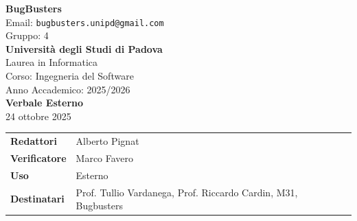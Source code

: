 \documentclass[a4paper,12pt]{article}
\begin{document}
\begin{center}  
  
  {\Large\bfseries\color{primaryblue} BugBusters}\\[0.3cm]
  {\small\color{darkgray} Email: \texttt{bugbusters.unipd@gmail.com}} \\[0.1cm]
  {\small\color{darkgray} Gruppo: 4} \\[0.5cm]

  {\large\bfseries Università degli Studi di Padova}\\[0.3cm]
  {\small Laurea in Informatica}\\[0.2cm]
  {\small Corso: Ingegneria del Software}\\[0.2cm]
  {\small Anno Accademico: 2025/2026}\\[0.8cm]

  {\Huge\bfseries\color{primaryblue} Verbale Esterno}\\[0.3cm]
  {\Large\color{secondaryblue} 24 ottobre 2025}\\[0.8cm]
\end{center}

\begin{center}
\begin{tcolorbox}[colback=lightgray,colframe=primaryblue,width=0.85\textwidth,arc=3mm,boxrule=0.5pt]
\begin{tabularx}{\linewidth}{@{}lX@{}}
\textbf{Redattori}   & Alberto Pignat\\
\textbf{Verificatore} & Marco Favero\\
\textbf{Uso}          & Esterno\\
\textbf{Destinatari}  & Prof. Tullio Vardanega, Prof. Riccardo Cardin, M31, Bugbusters\\
\end{tabularx}
\end{tcolorbox}
\end{center}
\end{document}
